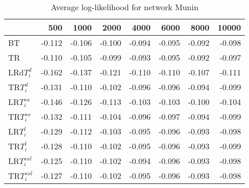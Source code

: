 \begin{table}
 \begin{center}
 \begin{tabular}{lrrrrrrr}
& 500 &  1000 & 2000 & 4000 & 6000& 8000&  10000\\\hline
BT & -0.112 & -0.106 & -0.100 & -0.094 & -0.095 & -0.092 & -0.098\\\hline
TR & -0.110 & -0.105 & -0.099 & -0.093 & -0.095 & -0.092 & -0.097\\\hline
LRd$T_i^d$ & -0.162 & -0.137 & -0.121 & -0.110 & -0.110 & -0.107 & -0.111\\\hline
TR$T_i^d$ & -0.131 & -0.110 & -0.102 & -0.096 & -0.096 & -0.094 & -0.099\\\hline
LR$T_i^{sx}$ & -0.146 & -0.126 & -0.113 & -0.103 & -0.103 & -0.100 & -0.104\\\hline
TR$T_i^{sx}$ & -0.132 & -0.111 & -0.104 & -0.096 & -0.097 & -0.094 & -0.099\\\hline
LR$T_i^l$ & -0.129 & -0.112 & -0.103 & -0.095 & -0.096 & -0.093 & -0.098\\\hline
TR$T_i^l$ & -0.128 & -0.110 & -0.102 & -0.095 & -0.096 & -0.093 & -0.099\\\hline
LR$T_i^{sxl}$ & -0.125 & -0.110 & -0.102 & -0.094 & -0.096 & -0.093 & -0.098\\\hline
TR$T_i^{sxl}$ & -0.127 & -0.110 & -0.102 & -0.095 & -0.096 & -0.093 & -0.098\\\hline
\end{tabular}
\end{center}
\caption{Average log-likelihood for network Munin }
\label{Muninll}
\end{table}


